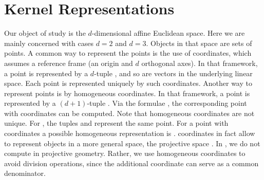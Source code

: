 \section{Kernel Representations}
Our object of study is the $d$-dimensional affine Euclidean space. 
Here we are mainly concerned with cases $d=2$ and $d=3$.
Objects in that space are sets of points. A common way to represent 
the points is the use of  coordinates,
which assumes a reference frame (an origin and $d$ orthogonal axes).
In that framework, a point is represented by a $d$-tuple
,
and so are vectors in the underlying linear space. Each point is 
represented uniquely by such  coordinates.
Another way to represent points is by homogeneous coordinates. In that
framework, a point is represented by a $(d+1)$-tuple
.
Via the formulae
,
the corresponding point with  coordinates
can be computed.  Note that homogeneous coordinates are not unique. 
For ,
the tuples 
 and 
 represent the
same point.
For a point with  coordinates  a
possible homogeneous representation is
.
 coordinates in fact allow to represent 
objects in a more general space, the projective space
.
In \cgal, we do not compute in projective geometry. Rather, we use 
homogeneous coordinates to avoid division operations,
since the additional coordinate can serve as a common denominator.

